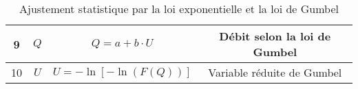 \begin{table}[H]
\begin{tabular}{c|cc|c}
        \hline
        9  & $Q$                                & $Q = a + b \cdot U$                                                                                                                       & Débit selon la loi de Gumbel \\
        \hline
        10 & $U$                                & $U = -\ln \left[ -\ln \left(F(Q)\right)\right]$                                                                                          & Variable réduite de Gumbel   \\
    \end{tabular}
    \caption{Ajustement statistique par la loi exponentielle et la loi de Gumbel}
    \label{tab:loiGumbel}
\end{table}